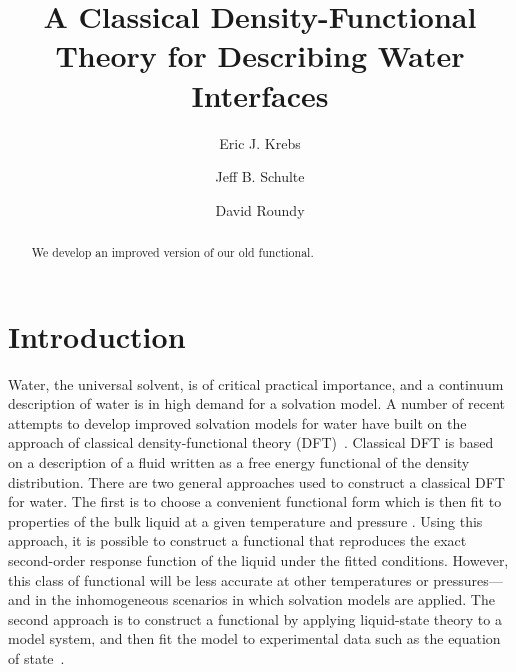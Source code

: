\documentclass[twocolumn,amsmath,amssymb,prl]{revtex4-1}
\begin{document}
\title{A Classical Density-Functional Theory for Describing Water Interfaces}

\author{Eric J. Krebs}
\author{Jeff B. Schulte}
\author{David Roundy}

\begin{abstract}
We develop an improved version of our old functional.
\end{abstract}
\maketitle

\section{Introduction}

Water, the universal solvent, is of critical practical importance, and
a continuum description of water is in high demand for a solvation
model.  A number of recent attempts to develop improved solvation
models for water have built on the approach of classical
density-functional theory (DFT)~\cite{jeanmairet2013molecular,
  zhao2011molecular, zhao2011new, ramirez2005direct,
  ramirez2005density, levesque2012solvation, levesque2012scalar}.
Classical DFT is based on a description of a fluid written as a free
energy functional of the density distribution.  There are two general
approaches used to construct a classical DFT for water.  The first is
to choose a convenient functional form which is then fit to properties
of the bulk liquid at a given temperature and pressure
\cite{jeanmairet2013molecular, zhao2011molecular, zhao2011new,
  ramirez2005direct, ramirez2005density, levesque2012solvation,
  levesque2012scalar, lischner2010classical}.  Using this approach, it
is possible to construct a functional that reproduces the exact
second-order response function of the liquid under the fitted
conditions.  However, this class of functional will be less accurate
at other temperatures or pressures---and in the inhomogeneous
scenarios in which solvation models are applied.  The second approach
is to construct a functional by applying liquid-state theory to a
model system, and then fit the model to experimental data such as the
equation of state~\cite{hughes2013classical, clark2006developing,
  gloor2002saft, gloor2004accurate, gloor2007prediction, Jaqaman2004,
  chuev2006, fu2005vapor-liquid-dft,kiselev2006new,
  blas2001examination, sundararaman2012computationally}.
\end{document}

